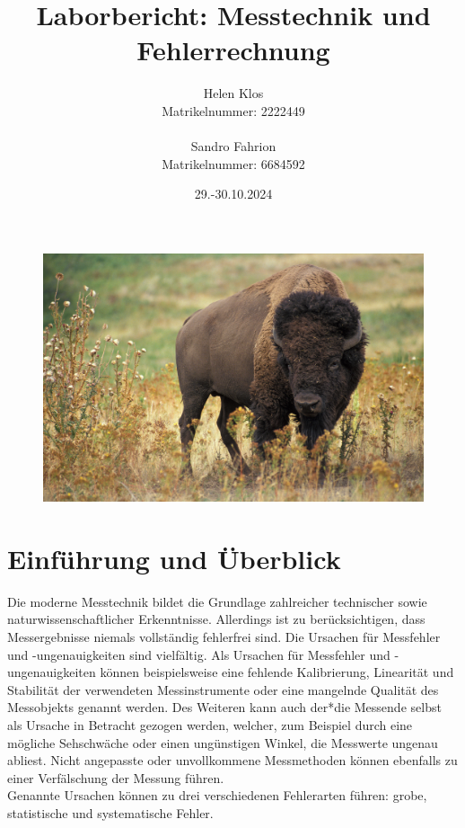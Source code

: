 \documentclass[a4paper,12pt]{article}
\title{Laborbericht: Messtechnik und Fehlerrechnung}
\author{Helen Klos \\Matrikelnummer: 2222449 \\ \\Sandro Fahrion \\Matrikelnummer: 6684592}
\date{29.-30.10.2024}
\begin{document}
\sloppy
\setlength{\emergencystretch}{5pt}
\maketitle

\begin{figure}[H]
    \centering
    \includegraphics[width=1.0\textwidth]{../Quellen/Labor2/Titelbild.jpg}
\end{figure}
\newpage
\tableofcontents
\newpage

\section*{Einführung und Überblick}
Die moderne Messtechnik bildet die Grundlage zahlreicher technischer sowie naturwissenschaftlicher Erkenntnisse. Allerdings ist zu berücksichtigen, dass Messergebnisse niemals vollständig fehlerfrei sind. Die Ursachen für Messfehler und -ungenauigkeiten sind vielfältig. Als Ursachen für Messfehler und -ungenauigkeiten können beispielsweise eine fehlende Kalibrierung, Linearität und Stabilität der verwendeten Messinstrumente oder eine mangelnde Qualität des Messobjekts genannt werden. Des Weiteren kann auch der*die Messende selbst als Ursache in Betracht gezogen werden, welcher, zum Beispiel durch eine mögliche Sehschwäche oder einen ungünstigen Winkel, die Messwerte ungenau abliest. Nicht angepasste oder unvollkommene Messmethoden können ebenfalls zu einer Verfälschung der Messung führen.\\
Genannte Ursachen können zu drei verschiedenen Fehlerarten führen: grobe, statistische und systematische Fehler. \\
\end{document}
